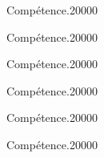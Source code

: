 \begin{pageParcoursd} %

\begin{ExoCdN}{Compétence.}{2}{0}{0}{0}{0}

\end{ExoCdN}

\begin{ExoCdN}{Compétence.}{2}{0}{0}{0}{0}

\end{ExoCdN}

\begin{ExoCdN}{Compétence.}{2}{0}{0}{0}{0}

\end{ExoCdN}

\begin{ExoCdN}{Compétence.}{2}{0}{0}{0}{0}

\end{ExoCdN}

\begin{ExoCdN}{Compétence.}{2}{0}{0}{0}{0}

\end{ExoCdN}

\begin{ExoCdN}{Compétence.}{2}{0}{0}{0}{0}

\end{ExoCdN}

\end{pageParcoursd} %



